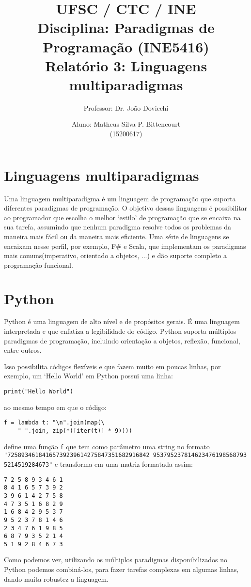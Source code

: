 \documentclass[a4paper,twocolumn,10pt]{article}
\begin{document}
\title{
	\large \rm UFSC / CTC / INE\\
	\large \rm Disciplina: Paradigmas de Programação (INE5416)\\
	\Large \bf Relatório 3: Linguagens multiparadigmas
}

\author{
	Professor: Dr. João Dovicchi\\
	\and
	Aluno: Matheus Silva P. Bittencourt\\(15200617)
}

\maketitle

\thispagestyle{empty} %

\section{Linguagens multiparadigmas}

Uma linguagem multiparadigma é um linguagem de programação que suporta
diferentes paradigmas de programação. O objetivo dessas linguagens é
possibilitar ao programador que escolha o melhor `estilo' de programação que se
encaixa na sua tarefa, assumindo que nenhum paradigma resolve todos os
problemas da maneira mais fácil ou da maneira mais eficiente. Uma série de
linguagens se encaixam nesse perfil, por exemplo, F\# e Scala, que implementam
os paradigmas mais comuns(imperativo, orientado a objetos, ...) e dão suporte
completo a programação funcional.

\section{Python}

Python é uma linguagem de alto nível e de propósitos gerais. É uma linguagem
interpretada e que enfatiza a legibilidade do código. Python suporta múltiplos
paradigmas de programação, incluindo orientação a objetos, reflexão, funcional,
entre outros.

Isso possibilita códigos flexíveis e que fazem muito em poucas
linhas, por exemplo, um `Hello World' em Python possui uma linha:
\begin{verbatim}
print("Hello World")
\end{verbatim}
ao mesmo tempo em que o código:
\begin{verbatim}
f = lambda t: "\n".join(map(\
    " ".join, zip(*([iter(t)] * 9))))
\end{verbatim}
define uma função \texttt{f} que tem como parâmetro uma string no formato
\texttt{"72589346184165739239614275847351682916842\
9537952378146234761985687935214519284673"} e transforma em uma matriz formatada
assim:
\begin{verbatim}
7 2 5 8 9 3 4 6 1
8 4 1 6 5 7 3 9 2
3 9 6 1 4 2 7 5 8
4 7 3 5 1 6 8 2 9
1 6 8 4 2 9 5 3 7
9 5 2 3 7 8 1 4 6
2 3 4 7 6 1 9 8 5
6 8 7 9 3 5 2 1 4
5 1 9 2 8 4 6 7 3
\end{verbatim}

Como podemos ver, utilizando os múltiplos paradigmas disponibilizados no Python
podemos combiná-los, para fazer tarefas complexas em algumas linhas, dando
muita robustez a linguagem.
\end{document}
